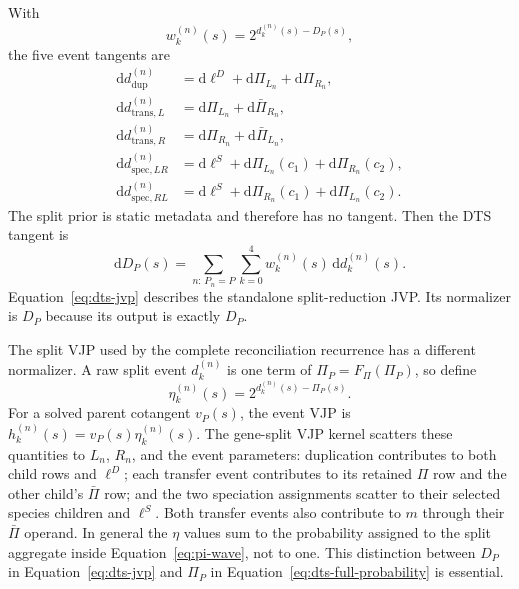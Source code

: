 \documentclass[11pt]{article}
\newcommand{\dd}{\mathrm{d}}
\begin{document}
With
\begin{equation}
  w_k^{(n)}(s)=2^{d_k^{(n)}(s)-D_P(s)},
\end{equation}
the five event tangents are
\begin{align}
  \dd d_{\mathrm{dup}}^{(n)}
    &=\dd\ell^D+\dd\Pi_{L_n}+\dd\Pi_{R_n},\\
  \dd d_{\mathrm{trans},L}^{(n)}
    &=\dd\Pi_{L_n}+\dd\bar\Pi_{R_n},\\
  \dd d_{\mathrm{trans},R}^{(n)}
    &=\dd\Pi_{R_n}+\dd\bar\Pi_{L_n},\\
  \dd d_{\mathrm{spec},LR}^{(n)}
    &=\dd\ell^S+\dd\Pi_{L_n}(c_1)+\dd\Pi_{R_n}(c_2),\\
  \dd d_{\mathrm{spec},RL}^{(n)}
    &=\dd\ell^S+\dd\Pi_{R_n}(c_1)+\dd\Pi_{L_n}(c_2).
  \label{eq:dts-event-jvps}
\end{align}
The split prior is static metadata and therefore has no tangent.  Then
the DTS tangent is
\begin{equation}
  \dd D_P(s)=
  \sum_{n:\,P_n=P}\sum_{k=0}^4w_k^{(n)}(s)\,\dd d_k^{(n)}(s).
  \label{eq:dts-jvp}
\end{equation}
Equation~\eqref{eq:dts-jvp} describes the standalone split-reduction JVP.  Its
normalizer is $D_P$ because its output is exactly $D_P$.

The split VJP used by the complete reconciliation recurrence has a different
normalizer.  A raw split event $d_k^{(n)}$ is one term of
$\Pi_P=F_\Pi(\Pi_P)$, so define
\begin{equation}
  \eta_k^{(n)}(s)=2^{d_k^{(n)}(s)-\Pi_P(s)}.
  \label{eq:dts-full-probability}
\end{equation}
For a solved parent cotangent $v_P(s)$, the event VJP is
$h_k^{(n)}(s)=v_P(s)\eta_k^{(n)}(s)$.  The gene-split VJP kernel scatters
these quantities to $L_n$, $R_n$, and the event parameters: duplication
contributes to both child rows and $\ell^D$; each transfer event contributes
to its retained $\Pi$ row and the other child's $\bar\Pi$ row; and the two
speciation assignments scatter to their selected species children and
$\ell^S$.  Both transfer events also contribute to $m$ through their
$\bar\Pi$ operand.  In general the $\eta$ values sum to the probability
assigned to the split aggregate inside
Equation~\eqref{eq:pi-wave}, not to one.  This distinction between $D_P$ in
Equation~\eqref{eq:dts-jvp} and $\Pi_P$ in
Equation~\eqref{eq:dts-full-probability} is essential.
\end{document}
